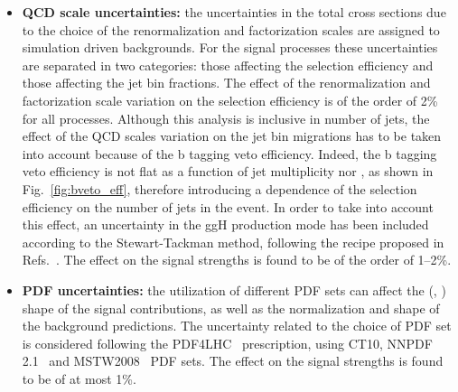 \begin{itemize}

\item {\bf QCD scale uncertainties:}
the uncertainties in the total cross sections due to the choice of the renormalization and factorization scales are assigned to simulation driven backgrounds. For the signal processes these uncertainties are separated in two categories: those affecting the selection efficiency and those affecting the jet bin fractions. The effect of the renormalization and factorization scale variation on the selection efficiency is of the order of 2\% for all processes. Although this analysis is inclusive in number of jets, the effect of the QCD scales variation on the jet bin migrations has to be taken into account because of the b tagging veto efficiency. Indeed, the b tagging veto efficiency is not flat as a function of jet multiplicity nor \pth, as shown in Fig.~\ref{fig:bveto_eff}, therefore introducing a dependence of the selection efficiency on the number of jets in the event.
In order to take into account this effect, an uncertainty in the ggH production mode has been included according to the Stewart-Tackman method, following the recipe proposed in Refs.~\cite{Stewart:2011cf,Heinemeyer:2013tqa}. The effect on the signal strengths is found to be of the order of 1--2\%.

\item {\bf PDF uncertainties:} 
the utilization of different PDF sets can affect the (\mll, \mt) shape of the signal contributions, as well as the normalization and shape of the background predictions. The uncertainty related to the choice of PDF set is considered following the PDF4LHC~\cite{Alekhin:2011sk,Botje:2011sn} prescription, using CT10, NNPDF 2.1~\cite{Ball:2011mu} and MSTW2008~\cite{Martin:2009iq} PDF sets. The effect on the signal strengths is found to be of at most 1\%.
\end{itemize}

